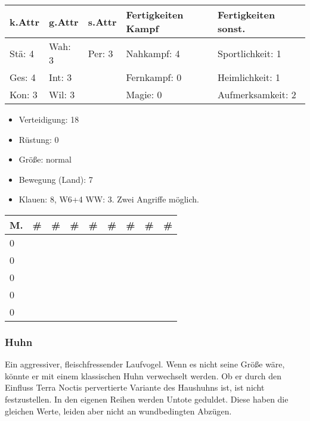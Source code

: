 \documentclass{article}
\begin{document}
\begin{small}
\begin{tabular}{|m{15mm}|m{15mm}|m{15mm}|m{35mm}|m{35mm}|}
\hline
\textbf{k.Attr}&\textbf{g.Attr}&\textbf{s.Attr}&\textbf{Fertigkeiten Kampf}&\textbf{Fertigkeiten sonst.}\\
\hline
\hline
Stä: 4&Wah: 3&Per: 3&Nahkampf: 4&Sportlichkeit: 1\\
\hline
Ges: 4&Int: 3& &Fernkampf: 0&Heimlichkeit: 1\\
\hline
Kon: 3&Wil: 3& &Magie: 0&Aufmerksamkeit: 2\\
\hline
\end{tabular}
\end{small}


\begin{itemize}
\item Verteidigung: 18
\item Rüstung:      0
\item Größe: normal
\item Bewegung (Land): 7
\item Klauen: 8, W6+4 WW: 3. Zwei Angriffe möglich.
\end{itemize}


\begin{small}
\begin{tabular}{|m{6mm}|m{3mm}|m{3mm}|m{3mm}|m{3mm}|m{3mm}|m{3mm}|m{3mm}|m{3mm}|}
\hline
\textbf{M.}&\textbf{\#}&\textbf{\#}&\textbf{\#}&\textbf{\#}&\textbf{\#}&\textbf{\#}&\textbf{\#}&\textbf{\#}\\
\hline
\hline
0& & & & & & & & \\
\hline
0& & & & & & & & \\
\hline
0& & & & & & & & \\
\hline
0& & & & & & & & \\
\hline
0& & & & & & & & \\
\hline
\end{tabular}
\end{small}

\subsubsection{Huhn}

Ein aggressiver, fleischfressender Laufvogel. Wenn es nicht seine Größe wäre, könnte er mit einem klassischen Huhn
verwechselt werden. Ob er durch den Einfluss Terra Noctis pervertierte Variante des Haushuhns ist, ist nicht
festzustellen. In den eigenen Reihen werden Untote geduldet. Diese haben die gleichen Werte, leiden aber nicht an
wundbedingten Abzügen.
\end{document}
